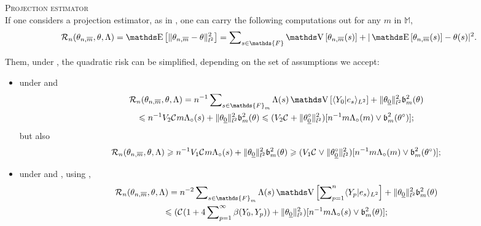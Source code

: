 \begin{ex}{\textsc{Projection estimator} \\}\label{EX_INTRO_FREQ_DECISION_RISKFUNCTION_MSEPROJ}
If one considers a projection estimator, as in , one can carry the following computations out for any $m$ in $\mathds{M}$,
\[ \mathcal{R}_{n}(\theta_{n, \overline{m}}, \theta, \Lambda) = \E\left[\Vert \theta_{n, \overline{m}} - \theta \Vert_{l^{2}}^{2} \right] = \sum\nolimits_{s \in \mathds{F}} \V\left[ \theta_{n, \overline{m}}(s) \right] + \vert \E\left[ \theta_{n, \overline{m}}(s) \right] - \theta(s) \vert^{2}.\]

Them, under , the quadratic risk can be simplified, depending on the set of assumptions we accept:
\begin{itemize}
\item under  and 
\begin{multline*}
\mathcal{R}_{n}(\theta_{n, \overline{m}}, \theta, \Lambda) = n^{-1} \sum\nolimits_{s \in \mathds{F}_{m}} \Lambda(s) \V\left[ \langle Y_{0} \vert e_{s} \rangle_{L^{2}} \right] + \Vert \theta_{\underline{0}}\Vert_{l^{2}}^{2}\mathfrak{b}_{m}^{2}(\theta)\\
\leq n^{-1} V_{2} \cst{} m \Lambda_{\circ}(s)  + \Vert \theta_{\underline{0}}\Vert_{l^{2}}^{2}\mathfrak{b}_{m}^{2}(\theta) \leq (V_{2} \cst{} + \Vert \theta^{\circ}_{\underline{0}} \Vert_{l^{2}}^{2})[n^{-1} m \Lambda_{\circ}(m) \vee \b_{m}^{2}(\theta^{\circ})];
\end{multline*}
but also
\begin{multline*}
\mathcal{R}_{n}(\theta_{n, \overline{m}}, \theta, \Lambda) \geqslant n^{-1} V_{1} {\mathcal C}^{}_{} m \Lambda_{\circ}(s)  + \Vert \theta_{\underline{0}}\Vert_{l^{2}}^{2}\mathfrak{b}_{m}^{2}(\theta) \geqslant (V_{1} {\mathcal C}^{}_{} \vee \Vert \theta^{\circ}_{\underline{0}} \Vert_{l^{2}}^{2})[n^{-1} m \Lambda_{\circ}(m) \vee \operatorname{\mathfrak{b}}_{m}^{2}(\theta^{\circ})];
\end{multline*}
\item under  and , using ,
\begin{multline*}
\mathcal{R}_{n}(\theta_{n, \overline{m}}, \theta, \Lambda) = n^{-2} \sum\nolimits_{s \in \mathds{F}_{m}} \Lambda(s) \V\left[\sum\nolimits_{p = 1}^{n} \langle Y_{p} \vert e_{s} \rangle_{L^{2}} \right] + \Vert \theta_{\underline{0}}\Vert_{l^{2}}^{2}\mathfrak{b}_{m}^{2}(\theta)\\
 \leq (\cst{} (1 + 4 \sum\nolimits_{p = 1}^{\infty} \beta(Y_{0}, Y_{p})) + \Vert \theta_{\underline{0}}\Vert_{l^{2}}^{2})[n^{-1} m \Lambda_{\circ}(s) \vee \mathfrak{b}_{m}^{2}(\theta)];

\end{multline*}
\end{itemize}
\end{ex}
